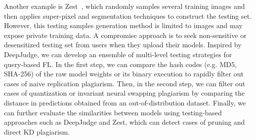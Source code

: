 Another example is Zest~\cite{jia2022zest}, which randomly samples several training images and then applies super-pixel and segmentation techniques to construct the testing set.
However, this testing samples generation method is limited to images and may expose private training data.
A compromise approach is to seek non-sensitive or desensitized testing set from users when they upload their models.
Inspired by DeepJudge, we can develop an ensemble of multi-level testing strategies for query-based FL.
In the first step, we can compare the hash codes (e.g. MD5, SHA-256) of the raw model weights or its binary execution to rapidly filter out cases of naive replication plagiarism.
Then, in the second step, we can filter out cases of quantization or invariant neural swapping plagiarism by comparing the distance in predictions obtained from an out-of-distribution dataset.
Finally, we can further evaluate the similarities between models using testing-based approaches such as DeepJudge and Zest, which can detect cases of pruning and direct KD plagiarism.

